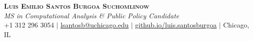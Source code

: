 \documentclass[letterpaper,11pt]{article}
\begin{document}

\begin{center}
    \textbf{\Large \scshape Luis Emilio Santos Burgoa Suchomlinow} \\ \vspace{1pt}
    \small \textit{MS in Computational Analysis \& Public Policy Candidate} \\
    +1 312 296 3054 $|$ \href{mailto:lsantosb@uchicago.edu} {{\underline{lsantosb@uchicago.edu}}} $|$ \href{https://suchomlinow.github.io/luis.santosburgoa/}{\underline{github.io/luis.santosburgoa}} $|$
    Chicago, IL
\end{center}


\end{document}
